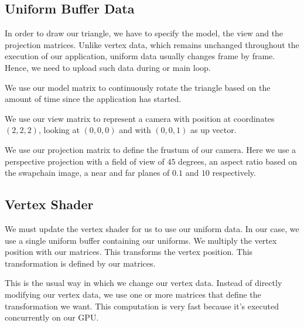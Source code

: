\subsection{Uniform Buffer Data}

In order to draw our triangle, we have to specify the model, the view and the
projection matrices.
Unlike vertex data, which remains unchanged throughout the execution of
our application, uniform data usually changes frame by frame.
Hence, we need to upload such data during or main loop.

We use our model matrix to continuously rotate the triangle based on the
amount of time since the application has started.

We use our view matrix to represent a camera with position at coordinates
$(2, 2, 2)$, looking at $(0, 0, 0)$ and with $(0, 0, 1)$ as up vector.

We use our projection matrix to define the frustum of our camera.
Here we use a perspective projection with a field of view of $45$ degrees,
an aspect ratio based on the swapchain image, a near and far planes of
$0.1$ and $10$ respectively.

\begin{minipage}{\linewidth}{\noindent}
    
\end{minipage}

\subsection{Vertex Shader}

We must update the vertex shader for us to use our uniform data.
In our case, we use a single uniform buffer containing our uniforms.
We multiply the vertex position with our matrices.
This transforms the vertex position.
This transformation is defined by our matrices.

This is the usual way in which we change our vertex data.
Instead of directly modifying our vertex data, we use one or more matrices
that define the transformation we want.
This computation is very fast because it's executed concurrently on our GPU.

\begin{minipage}{\linewidth}{\noindent}
    
\end{minipage}

